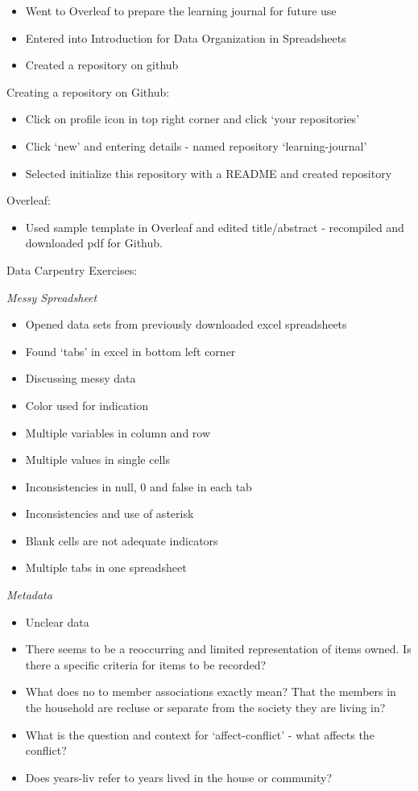 \documentclass{article}
\begin{document}
\begin{itemize}
\item Went to Overleaf to prepare the learning journal for future use
\item Entered into Introduction for Data Organization in Spreadsheets
\item Created a repository on github
\end{itemize}


Creating a repository on Github:

\begin{itemize}
\item Click on profile icon in top right corner and click ‘your repositories’
\item Click ‘new’ and entering details - named repository ‘learning-journal’
\item Selected initialize this repository with a README and created repository
\end{itemize}
 
Overleaf:
\begin{itemize}
\item Used sample template in Overleaf and edited title/abstract - recompiled and downloaded pdf for Github.

\end{itemize}

Data Carpentry Exercises:

\textit{Messy Spreadsheet}

\begin{itemize}
\item Opened data sets from previously downloaded excel spreadsheets
\item Found ‘tabs’ in excel in bottom left corner
\item Discussing messy data
\item Color used for indication
\item Multiple variables in column and row
\item Multiple values in single cells
\item Inconsistencies in null, 0 and false in each tab
\item Inconsistencies and use of asterisk
\item Blank cells are not adequate indicators
\item Multiple tabs in one spreadsheet
\end{itemize}

\textit{Metadata }


\begin{itemize}
\item Unclear data
\item There seems to be a reoccurring and limited representation of items owned. Is there a specific criteria for items to be recorded?
\item What does no to member associations exactly mean? That the members in the household are recluse or separate from the society they are living in?
\item What is the question and context for ‘affect-conflict’ - what affects the conflict?
\item Does years-liv refer to years lived in the house or community?
\end{itemize}
\end{document}
